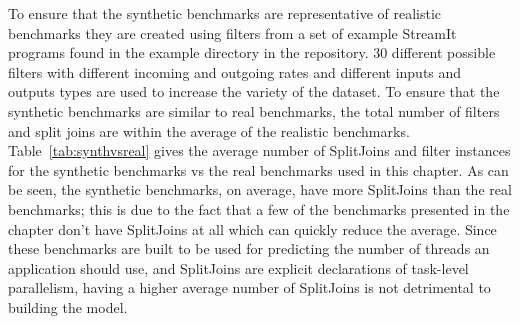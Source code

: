 To ensure that the synthetic benchmarks are representative of realistic benchmarks they are created using filters from a set of example StreamIt programs found in the example directory in the repository.
30 different possible filters with different incoming and outgoing rates and different inputs and outputs types are used to increase the variety of the dataset.
To ensure that the synthetic benchmarks are similar to real benchmarks, the total number of filters and split joins are within the average of the realistic benchmarks.
Table~\ref{tab:synthvsreal} gives the average number of SplitJoins and filter instances for the synthetic benchmarks vs the real benchmarks used in this chapter.
As can be seen, the synthetic benchmarks, on average, have more SplitJoins than the real benchmarks; this is due to the fact that a few of the benchmarks presented in the chapter don't have SplitJoins at all which can quickly reduce the average.
Since these benchmarks are built to be used for predicting the number of threads an application should use, and SplitJoins are explicit declarations of task-level parallelism, having a higher average number of SplitJoins is not detrimental to building the model.
